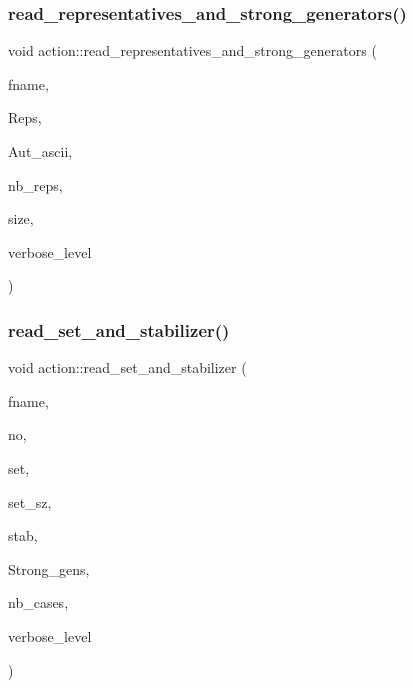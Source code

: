 \subsubsection{\texorpdfstring{read\+\_\+representatives\+\_\+and\+\_\+strong\+\_\+generators()}{read\_representatives\_and\_strong\_generators()}}
{\footnotesize\ttfamily void action\+::read\+\_\+representatives\+\_\+and\+\_\+strong\+\_\+generators (\begin{DoxyParamCaption}\item[{\mbox{\hyperlink{galois_8h_ab6cc7b4aeb6ea31aba2b3fbfc83ff5e6}{B\+Y\+TE}} $\ast$}]{fname,  }\item[{\mbox{\hyperlink{galois_8h_a09fddde158a3a20bd2dcadb609de11dc}{I\+NT}} $\ast$\&}]{Reps,  }\item[{\mbox{\hyperlink{galois_8h_ab6cc7b4aeb6ea31aba2b3fbfc83ff5e6}{B\+Y\+TE}} $\ast$$\ast$\&}]{Aut\+\_\+ascii,  }\item[{\mbox{\hyperlink{galois_8h_a09fddde158a3a20bd2dcadb609de11dc}{I\+NT}} \&}]{nb\+\_\+reps,  }\item[{\mbox{\hyperlink{galois_8h_a09fddde158a3a20bd2dcadb609de11dc}{I\+NT}} \&}]{size,  }\item[{\mbox{\hyperlink{galois_8h_a09fddde158a3a20bd2dcadb609de11dc}{I\+NT}}}]{verbose\+\_\+level }\end{DoxyParamCaption})}

\mbox{\label{classaction_a7e22ee51c869b45d98ec93ec431389f5}} 
\subsubsection{\texorpdfstring{read\+\_\+set\+\_\+and\+\_\+stabilizer()}{read\_set\_and\_stabilizer()}}
{\footnotesize\ttfamily void action\+::read\+\_\+set\+\_\+and\+\_\+stabilizer (\begin{DoxyParamCaption}\item[{const \mbox{\hyperlink{galois_8h_ab6cc7b4aeb6ea31aba2b3fbfc83ff5e6}{B\+Y\+TE}} $\ast$}]{fname,  }\item[{\mbox{\hyperlink{galois_8h_a09fddde158a3a20bd2dcadb609de11dc}{I\+NT}}}]{no,  }\item[{\mbox{\hyperlink{galois_8h_a09fddde158a3a20bd2dcadb609de11dc}{I\+NT}} $\ast$\&}]{set,  }\item[{\mbox{\hyperlink{galois_8h_a09fddde158a3a20bd2dcadb609de11dc}{I\+NT}} \&}]{set\+\_\+sz,  }\item[{\mbox{\hyperlink{classsims}{sims}} $\ast$\&}]{stab,  }\item[{\mbox{\hyperlink{classstrong__generators}{strong\+\_\+generators}} $\ast$\&}]{Strong\+\_\+gens,  }\item[{\mbox{\hyperlink{galois_8h_a09fddde158a3a20bd2dcadb609de11dc}{I\+NT}} \&}]{nb\+\_\+cases,  }\item[{\mbox{\hyperlink{galois_8h_a09fddde158a3a20bd2dcadb609de11dc}{I\+NT}}}]{verbose\+\_\+level }\end{DoxyParamCaption})}

